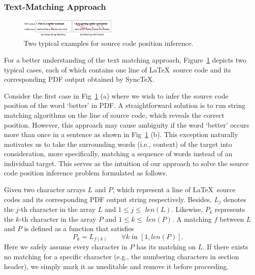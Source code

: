 \documentclass[sigconf]{acmart}
\begin{document}
\subsubsection{Text-Matching Approach}

\begin{figure}[t]
\begin{center}
\includegraphics[width=0.42\textwidth]{figure/charmapping}
\caption{Two typical examples for source code position inference.}
\label{fig:char}
\end{center}

\end{figure}
For a better understanding of the text matching approach, Figure~\ref{fig:char} depicts two typical cases, each of which contains one line of \LaTeX\ source code and its corresponding PDF output obtained by Sync\TeX. 

Consider the first case in Fig~\ref{fig:char} (a) where we wish to infer the source code position of the word `better' in PDF. 
A straightforward solution is to run string matching algorithms on the line of source code, which reveals the correct position. 
However, this approach may cause ambiguity if the word `better' occurs more than once in a sentence as shown in Fig~\ref{fig:char} (b).
This exception naturally motivates us to take the surrounding words (i.e., context) of the target into consideration, more specifically, matching a sequence of words instead of an individual target.
This serves as the intuition of our approach to solve the source code position inference problem formulated as follows.

Given two character arrays $L$ and $P$, which represent a line of \LaTeX\ source codes and its corresponding PDF output string respectively. 
Besides, $L_j$ denotes the $j$-th character in the array $L$ and $ 1 \le j \le $ $len(L)$. 
Likewise, $P_k$ represents the $k$-th character in the array $P$ and $ 1 \le k \le $ $len(P)$. 
A matching $f$ between $L$ and $P$ is defined as a function that satisfies 
\begin{equation}
P_k = L_{f(k)}  \quad \quad \forall k \text{ in } [1, len(P)].
\end{equation}
Here we safely assume every character in $P$ has its matching on $L$. 
If there exists no matching for a specific character (e.g., the numbering characters in section header), we simply mark it as uneditable and remove it before proceeding. 
\end{document}
